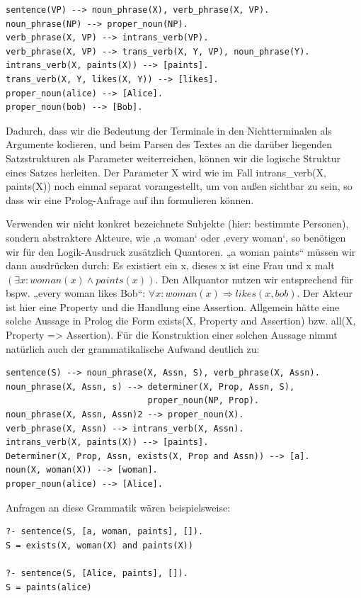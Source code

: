 \begin{verbatim}
sentence(VP) --> noun_phrase(X), verb_phrase(X, VP).
noun­_phrase(NP) --> proper_noun(NP).
verb_phrase(X, VP) --> intrans_verb(VP).
verb_phrase(X, VP) --> trans_verb(X, Y, VP), noun_phrase(Y).
intrans_verb(X, paints(X)) --> [paints].
trans_verb(X, Y, likes(X, Y)) --> [likes].
proper_noun(alice) --> [Alice].
proper_noun(bob) --> [Bob].
\end{verbatim}

Dadurch, dass wir die Bedeutung der Terminale in den Nichtterminalen als Argumente kodieren, und beim Parsen des Textes an die darüber liegenden Satzstrukturen als Parameter weiterreichen, können wir die logische Struktur eines Satzes herleiten.
Der Parameter X wird wie im Fall intrans\_verb(X, paints(X)) noch einmal separat vorangestellt, um von außen sichtbar zu sein, so dass wir eine Prolog-Anfrage auf ihn formulieren können.

Verwenden wir nicht konkret bezeichnete Subjekte (hier: bestimmte Personen), sondern abstraktere Akteure, wie ‚a woman‘ oder ‚every woman‘, so benötigen wir für den Logik-Ausdruck zusätzlich Quantoren.
„a woman paints“ müssen wir dann ausdrücken durch: Es existiert ein x, dieses x ist eine Frau und x malt $(\exists x: woman(x) \wedge paints(x))$.
Den Allquantor nutzen wir entsprechend für bspw.
„every woman likes Bob“: $\forall x: woman(x) \Rightarrow likes(x, bob)$.
Der Akteur ist hier eine Property und die Handlung eine Assertion.
Allgemein hätte eine solche Aussage in Prolog die Form exists(X, Property and Assertion) bzw.
all(X, Property => Assertion).
Für die Konstruktion einer solchen Aussage nimmt natürlich auch der grammatikalische Aufwand deutlich zu:

\begin{verbatim}
sentence(S) --> noun_phrase(X, Assn, S), verb_phrase(X, Assn).
noun­_phrase(X, Assn, s) --> determiner(X, Prop, Assn, S),
                            proper_noun(NP, Prop).
noun­_phrase(X, Assn, Assn)2 --> proper_noun(X).
verb_phrase(X, Assn) --> intrans_verb(X, Assn).
intrans_verb(X, paints(X)) --> [paints].
Determiner(X, Prop, Assn, exists(X, Prop and Assn)) --> [a].
noun(X, woman(X)) --> [woman].
proper_noun(alice) --> [Alice].
\end{verbatim}

Anfragen an diese Grammatik wären beispielsweise:
\begin{verbatim}
?- sentence(S, [a, woman, paints], []).
S = exists(X, woman(X) and paints(X))

?- sentence(S, [Alice, paints], []).
S = paints(alice)
\end{verbatim}

